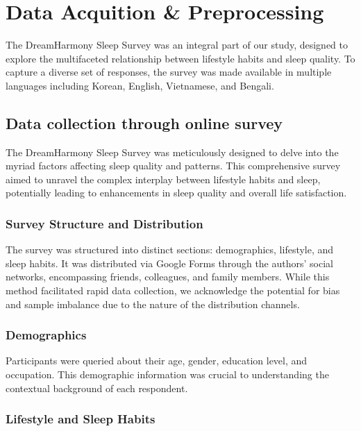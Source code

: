 \documentclass[conference]{IEEEtran}
\begin{document}
\section{Data Acquition \& Preprocessing}
The DreamHarmony Sleep Survey was an integral part of our study, designed to explore the multifaceted relationship between lifestyle habits and sleep quality. To capture a diverse set of responses, the survey was made available in multiple languages including Korean, English, Vietnamese, and Bengali.

\subsection{Data collection through online survey}
The DreamHarmony Sleep Survey was meticulously designed to delve into the myriad factors affecting sleep quality and patterns. This comprehensive survey aimed to unravel the complex interplay between lifestyle habits and sleep, potentially leading to enhancements in sleep quality and overall life satisfaction.
\subsubsection*{Survey Structure and Distribution}

The survey was structured into distinct sections: demographics, lifestyle, and sleep habits. It was distributed via Google Forms\cite{dhsurvey} through the authors' social networks, encompassing friends, colleagues, and family members. While this method facilitated rapid data collection, we acknowledge the potential for bias and sample imbalance due to the nature of the distribution channels.

\subsubsection*{Demographics}

Participants were queried about their age, gender, education level, and occupation. This demographic information was crucial to understanding the contextual background of each respondent.

\subsubsection*{Lifestyle and Sleep Habits}
\end{document}
